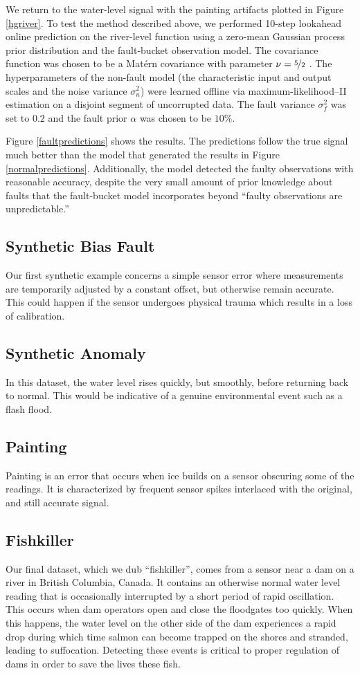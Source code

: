 \documentclass{article}
\begin{document}
We return to the water-level signal with the painting artifacts
plotted in Figure \ref{hgriver}.  To test the method described above,
we performed 10-step lookahead online prediction on the river-level
function using a zero-mean Gaussian process prior distribution and the
fault-bucket observation model.  The covariance function was chosen to
be a Mat\'{e}rn covariance with parameter $\nu = \nicefrac{5}{2}$
\citep{gpml}.  The hyperparameters of the non-fault model (the
characteristic input and output scales and the noise variance
$\sigma_n^2$) were learned offline via maximum-likelihood--II
estimation on a disjoint segment of uncorrupted data.  The fault
variance $\sigma_f^2$ was set to $0.2$ and the fault prior $\alpha$
was chosen to be $10\%$.

Figure \ref{faultpredictions} shows the results.  The predictions
follow the true signal much better than the model that generated the
results in Figure \ref{normalpredictions}.  Additionally, the model
detected the faulty observations with reasonable accuracy, despite the
very small amount of prior knowledge about faults that the
fault-bucket model incorporates beyond ``faulty observations are
unpredictable.''

\subsection{Synthetic Bias Fault}
Our first synthetic example concerns a simple sensor error where
measurements are temporarily adjusted by a constant offset, but
otherwise remain accurate. This could happen if the sensor undergoes
physical trauma which results in a loss of calibration.

\subsection{Synthetic Anomaly}
In this dataset, the water level rises quickly, but smoothly, before
returning back to normal. This would be indicative of a genuine
environmental event such as a flash flood.

\subsection{Painting}
Painting is an error that occurs when ice builds on a sensor obscuring
some of the readings. It is characterized by frequent sensor spikes
interlaced with the original, and still accurate signal.

\subsection{Fishkiller}
Our final dataset, which we dub ``fishkiller'', comes from a sensor
near a dam on a river in British Columbia, Canada. It contains an
otherwise normal water level reading that is occasionally interrupted
by a short period of rapid oscillation. This occurs when dam operators
open and close the floodgates too quickly. When this happens, the
water level on the other side of the dam experiences a rapid drop
during which time salmon can become trapped on the shores and
stranded, leading to suffocation. Detecting these events is critical
to proper regulation of dams in order to save the lives these fish.
\end{document}

